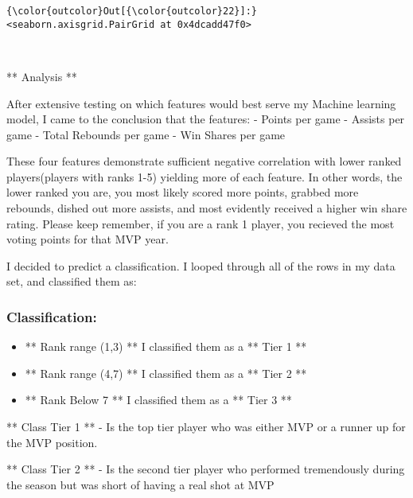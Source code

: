 \documentclass[11pt]{article}
\providecommand{\tightlist}{%
      \setlength{\itemsep}{0pt}\setlength{\parskip}{0pt}}
\begin{document}
\begin{Verbatim}[commandchars=\\\{\}]
{\color{outcolor}Out[{\color{outcolor}22}]:} <seaborn.axisgrid.PairGrid at 0x4dcadd47f0>
\end{Verbatim}
            
    \begin{center}
    \end{center}
    { \hspace*{\fill} \\}
    
    ** Analysis **

After extensive testing on which features would best serve my Machine
learning model, I came to the conclusion that the features: - Points per
game - Assists per game - Total Rebounds per game - Win Shares per game

These four features demonstrate sufficient negative correlation with
lower ranked players(players with ranks 1-5) yielding more of each
feature. In other words, the lower ranked you are, you most likely
scored more points, grabbed more rebounds, dished out more assists, and
most evidently received a higher win share rating. Please keep remember,
if you are a rank 1 player, you recieved the most voting points for that
MVP year.

I decided to predict a classification. I looped through all of the rows
in my data set, and classified them as:

\subsubsection{\texorpdfstring{Classification:}{Classification: }}\label{classification}

\begin{itemize}
\tightlist
\item
  ** Rank range (1,3) ** I classified them as a ** Tier 1 **
\item
  ** Rank range (4,7) ** I classified them as a ** Tier 2 **
\item
  ** Rank Below 7 ** I classified them as a ** Tier 3 **
\end{itemize}

** Class Tier 1 ** - Is the top tier player who was either MVP or a
runner up for the MVP position.

** Class Tier 2 ** - Is the second tier player who performed
tremendously during the season but was short of having a real shot at
MVP
\end{document}
